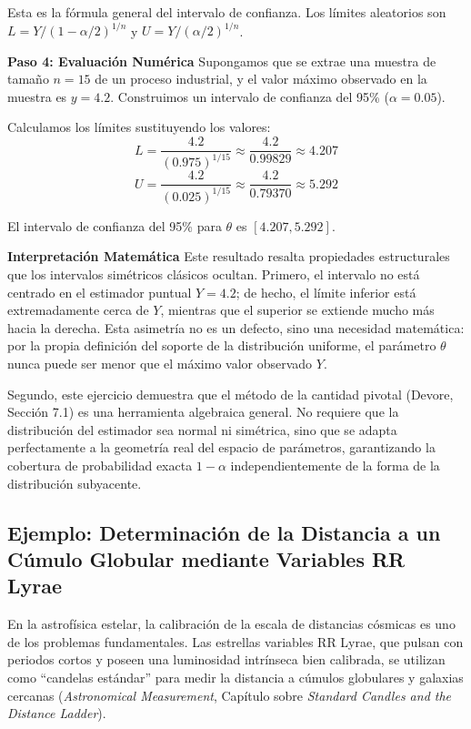 Esta es la fórmula general del intervalo de confianza. Los límites aleatorios son $L = Y / (1 - \alpha/2)^{1/n}$ y $U = Y / (\alpha/2)^{1/n}$.

\textbf{Paso 4: Evaluación Numérica}
Supongamos que se extrae una muestra de tamaño $n = 15$ de un proceso industrial, y el valor máximo observado en la muestra es $y = 4.2$. Construimos un intervalo de confianza del 95\% ($\alpha = 0.05$).

Calculamos los límites sustituyendo los valores:
$$ L = \frac{4.2}{(0.975)^{1/15}} \approx \frac{4.2}{0.99829} \approx 4.207 $$
$$ U = \frac{4.2}{(0.025)^{1/15}} \approx \frac{4.2}{0.79370} \approx 5.292 $$

El intervalo de confianza del 95\% para $\theta$ es $[4.207, 5.292]$.

\textbf{Interpretación Matemática}
Este resultado resalta propiedades estructurales que los intervalos simétricos clásicos ocultan. Primero, el intervalo no está centrado en el estimador puntual $Y=4.2$; de hecho, el límite inferior está extremadamente cerca de $Y$, mientras que el superior se extiende mucho más hacia la derecha. Esta asimetría no es un defecto, sino una necesidad matemática: por la propia definición del soporte de la distribución uniforme, el parámetro $\theta$ nunca puede ser menor que el máximo valor observado $Y$. 

Segundo, este ejercicio demuestra que el método de la cantidad pivotal (Devore, Sección 7.1) es una herramienta algebraica general. No requiere que la distribución del estimador sea normal ni simétrica, sino que se adapta perfectamente a la geometría real del espacio de parámetros, garantizando la cobertura de probabilidad exacta $1-\alpha$ independientemente de la forma de la distribución subyacente.


\subsection{Ejemplo: Determinación de la Distancia a un Cúmulo Globular mediante Variables RR Lyrae}

En la astrofísica estelar, la calibración de la escala de distancias cósmicas es uno de los problemas fundamentales. Las estrellas variables RR Lyrae, que pulsan con periodos cortos y poseen una luminosidad intrínseca bien calibrada, se utilizan como ``candelas estándar'' para medir la distancia a cúmulos globulares y galaxias cercanas (\textit{Astronomical Measurement}, Capítulo sobre \textit{Standard Candles and the Distance Ladder}). 

